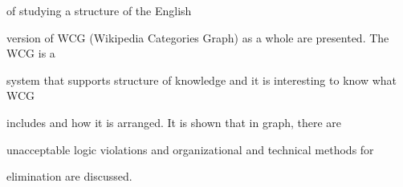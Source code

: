 \noindent of studying a structure of the English 


version of WCG (Wikipedia Categories Graph) as a whole are presented. The WCG is a 


system that supports structure of knowledge and it is interesting to know what WCG 


includes and how it is arranged. It is shown that in graph, there are 


unacceptable logic violations and organizational and technical methods for 


elimination are discussed.








\vspace*{-5pt}










\def\leftkol{ENGLISH ABSTRACTS}





\def\rightkol{ENGLISH ABSTRACTS}












\def\tit{ACTIVE AUTHENTICATION METHODS USING KEYSTROKE DYNAMICS}





\def\aut{V.\,Yu.~Kaganov$^1$, A.\,K.~Korolyov$^2$, M.\,N.~Krylov$^3$, 


I.\,V.~Mashechkin$^4$, and~M.\,I.~Petrovskiy$^5$}





